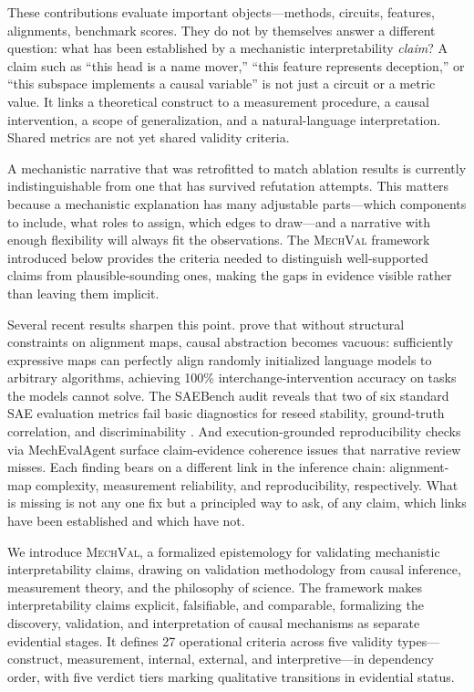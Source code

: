 \documentclass[10pt]{article}
\newcommand{\mechval}{\textsc{MechVal}}
\begin{document}
These contributions evaluate important objects---methods, circuits, features, alignments,
benchmark scores. They do not by themselves answer a different question: what has been
established by a mechanistic interpretability \emph{claim}? A claim such as ``this head is
a name mover,'' ``this feature represents deception,'' or ``this subspace implements a
causal variable'' is not just a circuit or a metric value. It links a theoretical
construct to a measurement procedure, a causal intervention, a scope of generalization,
and a natural-language interpretation. Shared metrics are not yet shared validity criteria.

A mechanistic narrative that was retrofitted to match ablation results is currently
indistinguishable from one that has survived refutation attempts. This matters because a
mechanistic explanation has many adjustable parts---which components to include, what roles
to assign, which edges to draw---and a narrative with enough flexibility will always fit
the observations. The \mechval{} framework introduced below provides the criteria needed to
distinguish well-supported claims from plausible-sounding ones, making the gaps in evidence
visible rather than leaving them implicit.

Several recent results sharpen this point. \citet{sutter2025nonlinear} prove that without
structural constraints on alignment maps, causal abstraction becomes vacuous: sufficiently
expressive maps can perfectly align randomly initialized language models to arbitrary
algorithms, achieving 100\% interchange-intervention accuracy on tasks the models cannot
solve. The SAEBench audit reveals that two of six standard SAE evaluation metrics fail
basic diagnostics for reseed stability, ground-truth correlation, and discriminability
\citep{karvonen2025saebench}. And execution-grounded reproducibility checks via
MechEvalAgent \citep{bai2026mecheval} surface claim-evidence coherence issues that
narrative review misses. Each finding bears on a different link in the inference chain:
alignment-map complexity, measurement reliability, and reproducibility, respectively. What
is missing is not any one fix but a principled way to ask, of any claim, which links have
been established and which have not.

We introduce \mechval{}, a formalized epistemology for validating mechanistic
interpretability claims, drawing on validation methodology from causal inference,
measurement theory, and the philosophy of science. The framework makes interpretability
claims explicit, falsifiable, and comparable, formalizing the discovery, validation, and
interpretation of causal mechanisms as separate evidential stages. It defines 27
operational criteria across five validity types---construct, measurement, internal,
external, and interpretive---in dependency order, with five verdict tiers marking
qualitative transitions in evidential status.
\end{document}
